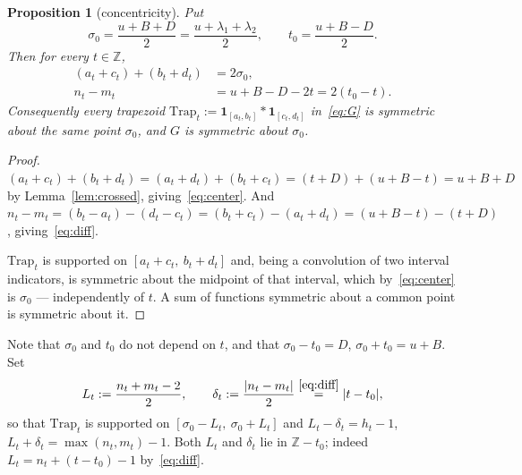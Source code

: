 \documentclass[11pt]{article}
\newtheorem{proposition}[theorem]{Proposition}
\theoremstyle{definition}
\newcommand{\Z}{\mathbb Z}
\DeclarePairedDelimiter{\abs}{\lvert}{\rvert}
\begin{document}
\begin{proposition}[concentricity]\label{prop:concentric}
Put
\[
  \sigma_0=\frac{u+B+D}{2}=\frac{u+\lambda_1+\lambda_2}{2},
  \qquad
  t_0=\frac{u+B-D}{2}.
\]
Then for every $t\in\Z$,
\begin{align}
  (a_t+c_t)+(b_t+d_t)&=2\sigma_0, \label{eq:center}\\
  n_t-m_t&=u+B-D-2t=2(t_0-t). \label{eq:diff}
\end{align}
Consequently every trapezoid
$\mathrm{Trap}_t:=\mathbf 1_{[a_t,b_t]}*\mathbf 1_{[c_t,d_t]}$ in~\eqref{eq:G} is symmetric
about the \emph{same} point $\sigma_0$, and $G$ is symmetric about $\sigma_0$.
\end{proposition}
\begin{proof}
$(a_t+c_t)+(b_t+d_t)=(a_t+d_t)+(b_t+c_t)=(t+D)+(u+B-t)=u+B+D$ by
Lemma~\ref{lem:crossed}, giving~\eqref{eq:center}. And
$n_t-m_t=(b_t-a_t)-(d_t-c_t)=(b_t+c_t)-(a_t+d_t)=(u+B-t)-(t+D)$,
giving~\eqref{eq:diff}.

$\mathrm{Trap}_t$ is supported on $[a_t+c_t,\ b_t+d_t]$ and, being a convolution of two
interval indicators, is symmetric about the midpoint of that interval, which
by~\eqref{eq:center} is $\sigma_0$ --- independently of $t$. A sum of functions symmetric
about a common point is symmetric about it.
\end{proof}

Note that $\sigma_0$ and $t_0$ do not depend on $t$, and that $\sigma_0-t_0=D$,
$\sigma_0+t_0=u+B$. Set
\[
  L_t:=\frac{n_t+m_t-2}{2},\qquad \delta_t:=\frac{\abs{n_t-m_t}}{2}\overset{\eqref{eq:diff}}{=}\abs{t-t_0},
\]
so that $\mathrm{Trap}_t$ is supported on $[\sigma_0-L_t,\ \sigma_0+L_t]$ and
$L_t-\delta_t=h_t-1$, $L_t+\delta_t=\max(n_t,m_t)-1$. Both $L_t$ and $\delta_t$ lie in
$\Z-t_0$; indeed $L_t=n_t+(t-t_0)-1$ by~\eqref{eq:diff}.
\end{document}
